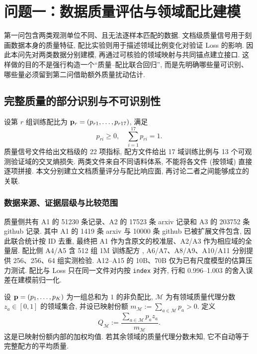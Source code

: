 \section{问题一：数据质量评估与领域配比建模}\label{sec:q1}

第一问包含两类观测单位不同、且无法逐样本匹配的数据. 文档级质量信号用于刻画数据本身的质量特征,  配比实验则用于描述领域比例变化对验证 Loss 的影响. 因此本问先对两类数据分别建模,  再通过可核验的领域映射与共同锚点建立接口. 这样做的目的不是强行构造一个“质量--配比联合回归”, 而是先明确哪些量可识别、哪些量必须留到第二问借助额外质量扰动估计. 

\subsection{完整质量的部分识别与不可识别性}

设第 $r$ 组训练配比为 $\mathbf p_r=(p_{r1}, \ldots, p_{r17})$, 满足
\begin{equation}\label{eq:simplex}
    p_{ri}\ge 0, \quad \sum_{i=1}^{17}p_{ri}=1.
\end{equation}
质量信号文件给出文档级的 22 项指标, 配方文件给出 17 域训练比例与 13 个可观测验证域的交叉熵损失. 两类文件来自不同语料体系, 不能将各文件 (按领域) 直接逐项拼接. 本文分别建立文档质量评分与配比响应面, 再讨论二者之间能够成立的关联. 

\subsubsection{数据来源、证据层级与比较范围} 质量侧共有 A1 的 51230 条记录、A2 的 17523 条 arxiv 记录和 A3 的 203752 条 github 记录. 其中 A1 的 1419 条 arxiv 与 10000 条 github 已被扩展文件包含, 因此联合统计按 ID 去重, 最终把 A1 作为含原文的校准层、A2/A3 作为相应域的全量层. 配比侧 A4/A5 含 512 组 1M 训练配方 , A6/A7、A8/A9、A10/A11 分别提供 256、256、64 组实测检验. A12--A15 的 10B、70B 仅为已有尺度模型的估算压力测试. 配比与 Loss 只在同一文件对内按 \texttt{index} 对齐, 行和 0.996--1.003 的舍入误差在建模前归一化.

\begin{definition}[已映射份额的条件均值]\label{def:background-mapped-quality}
设 $\mathbf p=(p_1, \ldots, p_K)$ 为一组总和为 $1$ 的非负配比, $\mathcal M$ 为有领域质量代理分数 $z_a\in[0, 1]$ 的领域集合, 并设已映射份额 $m_{\mathcal M}:=\sum_{a\in\mathcal M}p_a>0$. 定义
\[
Q_{\mathcal M}:=\frac{\sum_{a\in\mathcal M}p_az_a}{m_{\mathcal M}}.
\]
这是已映射份额内部的加权均值. 若其余领域的质量代理分数未知, 它不自动等于完整配方的平均质量. 
\end{definition}

